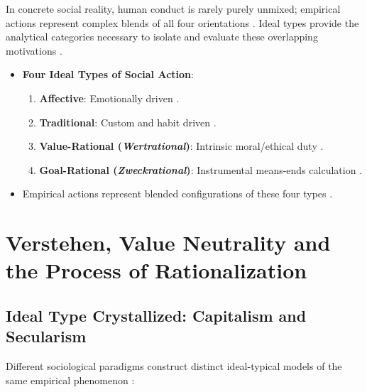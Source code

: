 \begin{CriticalPoint}
In concrete social reality, human conduct is rarely purely unmixed; empirical actions represent complex blends of all four orientations . Ideal types provide the analytical categories necessary to isolate and evaluate these overlapping motivations .
\end{CriticalPoint}

\begin{QuickRevision}
\begin{itemize}
    \item \textbf{Four Ideal Types of Social Action}:
    \begin{enumerate}
        \item \textbf{Affective}: Emotionally driven .
        \item \textbf{Traditional}: Custom and habit driven .
        \item \textbf{Value-Rational (\textit{Wertrational})}: Intrinsic moral/ethical duty .
        \item \textbf{Goal-Rational (\textit{Zweckrational})}: Instrumental means-ends calculation .
    \end{enumerate}
    \item Empirical actions represent blended configurations of these four types .
\end{itemize}
\end{QuickRevision}

\sectiondivider


\section{Verstehen, Value Neutrality and the Process of Rationalization}

\subsection{Ideal Type Crystallized: Capitalism and Secularism}

Different sociological paradigms construct distinct ideal-typical models of the same empirical phenomenon :

